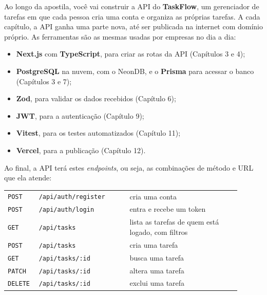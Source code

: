 Ao longo da apostila, você vai construir a API do \textbf{TaskFlow}, um gerenciador de tarefas em que cada pessoa cria uma conta e organiza as próprias tarefas. A cada capítulo, a API ganha uma parte nova, até ser publicada na internet com domínio próprio. As ferramentas são as mesmas usadas por empresas no dia a dia:

\begin{itemize}
  \item \textbf{Next.js} com \textbf{TypeScript}, para criar as rotas da API (Capítulos 3 e 4);
  \item \textbf{PostgreSQL} na nuvem, com o NeonDB, e o \textbf{Prisma} para acessar o banco (Capítulos 3 e 7);
  \item \textbf{Zod}, para validar os dados recebidos (Capítulo 6);
  \item \textbf{JWT}, para a autenticação (Capítulo 9);
  \item \textbf{Vitest}, para os testes automatizados (Capítulo 11);
  \item \textbf{Vercel}, para a publicação (Capítulo 12).
\end{itemize}

Ao final, a API terá estes \textit{endpoints}, ou seja, as combinações de método e URL que ela atende:

\begin{center}
\begin{tabular}{@{}P{0.1\linewidth}P{0.36\linewidth}P{0.44\linewidth}@{}}
\toprule
{}
 &  &  \\
\midrule
\texttt{POST} & \texttt{/api/auth/register} & cria uma conta \\
 \texttt{POST} & \texttt{/api/auth/login} & entra e recebe um token \\
\texttt{GET} & \texttt{/api/tasks} & lista as tarefas de quem está logado, com filtros \\
 \texttt{POST} & \texttt{/api/tasks} & cria uma tarefa \\
\texttt{GET} & \texttt{/api/tasks/:id} & busca uma tarefa \\
 \texttt{PATCH} & \texttt{/api/tasks/:id} & altera uma tarefa \\
\texttt{DELETE} & \texttt{/api/tasks/:id} & exclui uma tarefa \\
\bottomrule
\end{tabular}
\end{center}

